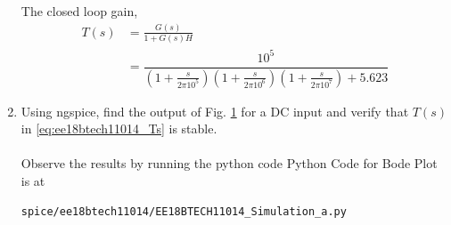 \begin{enumerate}[label=\thesection.\arabic*.,ref=\thesection.\theenumi]
\begin{figure}[ht!]
	\begin{center}
		\resizebox{\columnwidth}{!}{}
	\end{center}
	\caption{}
	\label{fig:ee18btech11014_Closed-Loop Circuit}
\end{figure}

%
%
%
%
The closed loop gain,
\begin{align}
T(s) &= \frac{G(s)}{1+G(s)H}
\\
&=\dfrac{10^5}{\left(1+\frac{s}{2\pi 10^{5}}\right)\left(1+\frac{s}{2\pi 10^{6}}\right)\left(1+\frac{s}{2\pi 10^{7}}\right)+5.623}
\label{eq:ee18btech11014_Ts}
\end{align}
\item Using ngspice, find the output of Fig. 	\ref{fig:ee18btech11014_Closed-Loop Circuit} for a DC input and verify that $T(s)$ in \eqref{eq:ee18btech11014_Ts} is stable.\\
\solution\\
Observe the results by running the python code
Python Code for Bode Plot is at
\begin{lstlisting}
spice/ee18btech11014/EE18BTECH11014_Simulation_a.py
\end{lstlisting}

\end{enumerate}
